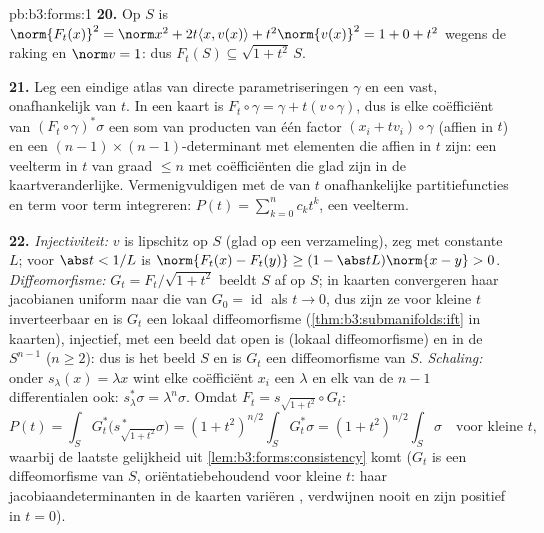 \begin{solution}{pb:b3:forms:1}
\textbf{20.} Op $S$ is $\norm{F_t(x)}^2 = \norm x^2 + 2t\langle
x, v(x)\rangle + t^2\norm{v(x)}^2 = 1 + 0 + t^2$ wegens de raking
en $\norm v = 1$: dus $F_t(S) \subseteq \sqrt{1+t^2}\,S$.

\textbf{21.} Leg een eindige atlas van directe parametriseringen
$\gamma$ en een  vast, onafhankelijk van
$t$. In een kaart is $F_t\circ\gamma = \gamma + t(v\circ\gamma)$,
dus is elke coëfficiënt van $(F_t\circ\gamma)^*\sigma$ een som
van producten van één factor $(x_i + tv_i)\circ\gamma$ (affien in
$t$) en een $(n-1)\times(n-1)$-determinant met elementen die
affien in $t$ zijn: een veelterm in $t$ van graad $\leq n$ met
coëfficiënten die glad zijn in de kaartveranderlijke.
Vermenigvuldigen met de van $t$ onafhankelijke partitiefuncties
en term voor term integreren: $P(t) = \sum_{k=0}^n c_kt^k$, een
veelterm.

\textbf{22.} \emph{Injectiviteit:} $v$ is lipschitz op $S$ (glad
op een  verzameling), zeg met constante $L$; voor $\abs t
< 1/L$ is $\norm{F_t(x) - F_t(y)} \geq (1 - \abs tL)\norm{x - y}
> 0$. \emph{Diffeomorfisme:} $G_t = F_t/\sqrt{1 + t^2}$ beeldt
$S$ af op $S$; in kaarten convergeren haar jacobianen uniform
naar die van $G_0 = \operatorname{id}$ als $t \to 0$, dus zijn ze
voor kleine $t$ inverteerbaar en is $G_t$ een lokaal
diffeomorfisme (\cref{thm:b3:submanifolds:ift} in kaarten),
injectief, met een beeld dat open is (lokaal diffeomorfisme) en
 in de \emph{} $S^{n-1}$ ($n \geq 2$): dus is
het beeld $S$ en is $G_t$ een diffeomorfisme van $S$.
\emph{Schaling:} onder $s_\lambda(x) = \lambda x$ wint elke
coëfficiënt $x_i$ een $\lambda$ en elk van de $n - 1$
differentialen ook: $s_\lambda^*\sigma = \lambda^n\sigma$. Omdat
$F_t = s_{\sqrt{1+t^2}}\circ G_t$:
\[
P(t) = \int_SG_t^*\bigl(s_{\sqrt{1+t^2}}^{\,*}\sigma\bigr)
= (1 + t^2)^{n/2}\int_SG_t^*\sigma
= (1 + t^2)^{n/2}\int_S\sigma
\quad\text{voor kleine } t,
\]
waarbij de laatste gelijkheid uit
\cref{lem:b3:forms:consistency} komt ($G_t$ is een
diffeomorfisme van $S$, oriëntatiebehoudend voor kleine $t$: haar
jacobiaandeterminanten in de kaarten variëren , verdwijnen
nooit en zijn positief in $t = 0$).


\end{solution}
